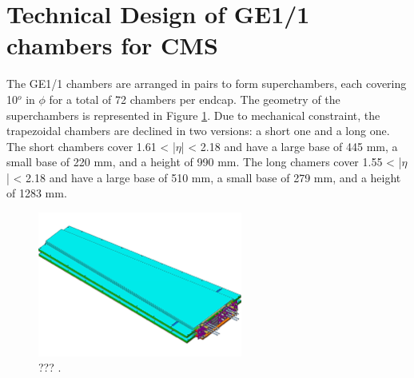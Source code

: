   \section{Technical Design of GE1/1 chambers for CMS}

    The GE1/1 chambers are arranged in pairs to form superchambers, each covering 10$^o$ in $ \phi $ for a total of 72 chambers per endcap. The geometry of the superchambers is represented in Figure \ref{fig:II-1-gem-superchamber}. Due to mechanical constraint, the trapezoidal chambers are declined in two versions: a short one and a long one. The short chambers cover 1.61 < |$\eta$| < 2.18 and have a large base of 445 mm, a small base of 220 mm, and a height of 990 mm. The long chamers cover 1.55 < |$\eta$| < 2.18 and have a large base of 510 mm, a small base of 279 mm, and a height of 1283 mm. \\

    \begin{figure}[h!]
      \centering
      \includegraphics[width=0.6\textwidth]{img/II-1-gem/superchamber.pdf}
      \caption{??? \cite{Colaleo:2021453}.}
      \label{fig:II-1-gem-superchamber}
    \end{figure}

